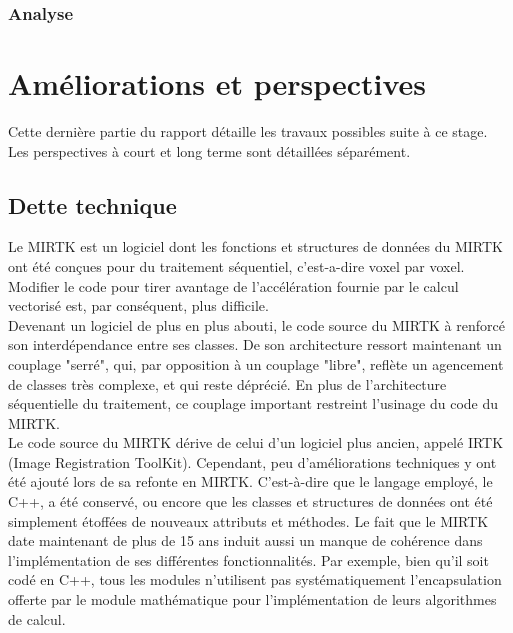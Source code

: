 \documentclass[10pt]{report}
\begin{document}
	\subsection{Analyse}
	
\chapter{Améliorations et perspectives} \vspace{-1cm}
Cette dernière partie du rapport détaille les travaux possibles suite à ce stage. Les perspectives à court et long terme sont détaillées séparément.
\section{Dette technique}

	Le MIRTK est un logiciel dont les fonctions et structures de données du MIRTK ont été conçues pour du traitement séquentiel, c'est-a-dire voxel par voxel. Modifier le code pour tirer avantage de l'accélération fournie par le calcul vectorisé est, par conséquent, plus difficile.\\
	
	Devenant un logiciel de plus en plus abouti, le code source du MIRTK à renforcé son interdépendance entre ses classes. De son architecture ressort maintenant un couplage "serré", qui, par opposition à un couplage "libre", reflète un agencement de classes très complexe, et qui reste déprécié. En plus de l'architecture séquentielle du traitement, ce couplage important restreint l'usinage du code du MIRTK.\\
	
	Le code source du MIRTK dérive de celui d'un logiciel plus ancien, appelé IRTK (Image Registration ToolKit). Cependant, peu d'améliorations techniques y ont été ajouté lors de sa refonte en MIRTK. C'est-à-dire que le langage employé, le C++, a été conservé, ou encore que les classes et structures de données ont été simplement étoffées de nouveaux attributs et méthodes. Le fait que le MIRTK date maintenant de plus de 15 ans induit aussi un manque de cohérence dans l'implémentation de ses différentes fonctionnalités. Par exemple, bien qu'il soit codé en C++, tous les modules n'utilisent pas systématiquement l'encapsulation offerte par le module mathématique pour l'implémentation de leurs algorithmes de calcul. 
\end{document}
